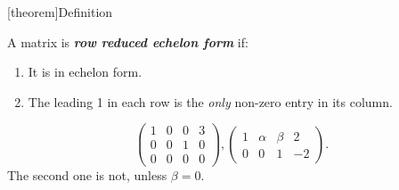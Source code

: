 \documentclass[12pt]{report}
\theoremstyle{definition}
\begin{document}
[theorem]{Definition}
\begin{reduced echelon form}
    A matrix is \textbf{\emph{row reduced echelon form}} if:
    \begin{enumerate}[label = (\arabic*)]
        \item It is in echelon form.
        \item The leading 1 in each row is the \emph{only} non-zero entry in its column.
    \end{enumerate}
\end{reduced echelon form}

\begin{ex}
    \[
        \begin{pmatrix}
            1 & 0 & 0 & 3\\
            0 & 0 & 1 & 0\\
            0 & 0 & 0 & 0
        \end{pmatrix}, \begin{pmatrix}
            1 & \alpha & \beta & 2\\
            0 & 0 & 1 & -2
        \end{pmatrix}.
    \]
    The second one is not, unless $\beta = 0$.
\end{ex}
\end{document}
